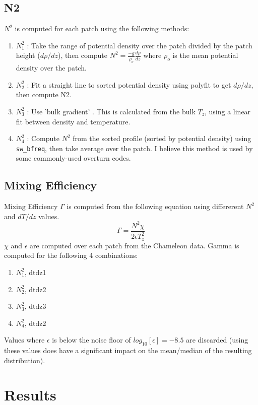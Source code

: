 \documentclass[11pt]{article}
\begin{document}
\subsection{N2}

$N^2$ is computed for each patch using the following methods:
\begin{enumerate}
\item $N^2_1$ : Take the range of potential density over the patch divided by the patch height ($d\rho/dz$), then compute $N^2=\frac{-g}{\rho_o}\frac{d\rho}{dz}$ where $\rho_o$ is the mean potential density over the patch.
\item $N^2_2$ : Fit a straight line to sorted potential density using polyfit to get $d\rho/dz$, then compute N2.
\item $N^2_3$ : Use 'bulk gradient' . This is calculated from the bulk $T_z$, using a linear fit between density and temperature.
\item $N^2_4$ : Compute $N^2$ from the sorted profile (sorted by potential density) using \verb+sw_bfreq+, then take average over the patch. I believe this method is used by some commonly-used overturn codes.
\end{enumerate}


\subsection{Mixing Efficiency}

Mixing Efficiency $\Gamma$ is computed from the following equation using differerent $N^2$ and $dT/dz$ values.
\begin{equation}
\Gamma=\frac{N^2 \chi}{2\epsilon T_{z}^{2}} 
\end{equation}
$\chi$ and $\epsilon$ are computed over each patch from the Chameleon data. Gamma is computed for the following 4 combinations:
\begin{enumerate}
\item  $N^2_1$, dtdz1
\item $N^2_2$, dtdz2
\item $N^2_3$, dtdz3
\item $N^2_4$, dtdz2
\end{enumerate}
Values where $\epsilon$ is below the noise floor of $log_{10}[\epsilon]=-8.5$ are discarded (using these values does have a significant impact on the mean/median of the resulting distribution).



\section{Results}
\end{document}
